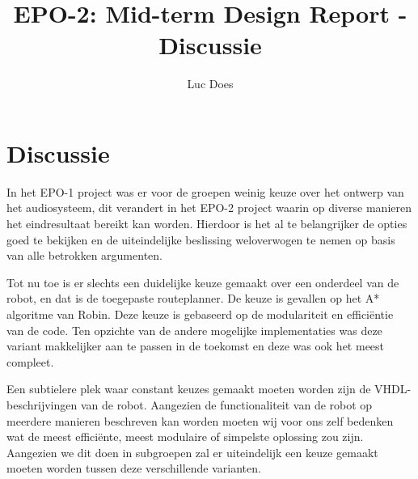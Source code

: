 \documentclass{report}
\title{EPO-2: Mid-term Design Report - Discussie}
\author{Luc Does}
\begin{document}
\chapter{Discussie}
\label{ch:discussie}

In het EPO-1 project was er voor de groepen weinig keuze over het ontwerp van het audiosysteem, dit verandert in het EPO-2 project waarin op diverse manieren het eindresultaat bereikt kan worden. Hierdoor is het al te belangrijker de opties goed te bekijken en de uiteindelijke beslissing weloverwogen te nemen op basis van alle betrokken argumenten. \newline

Tot nu toe is er slechts een duidelijke keuze gemaakt over een onderdeel van de robot, en dat is de toegepaste routeplanner. De keuze is gevallen op het A* algoritme van Robin. Deze keuze is gebaseerd op de modulariteit en efficiëntie van de code. Ten opzichte van de andere mogelijke implementaties was deze variant makkelijker aan te passen in de toekomst en deze was ook het meest compleet. \newline

Een subtielere plek waar constant keuzes gemaakt moeten worden zijn de VHDL-beschrijvingen van de robot. Aangezien de functionaliteit van de robot op meerdere manieren beschreven kan worden moeten wij voor ons zelf bedenken wat de meest efficiënte, meest modulaire of simpelste oplossing zou zijn. Aangezien we dit doen in subgroepen zal er uiteindelijk een keuze gemaakt moeten worden tussen deze verschillende varianten. \newline
\end{document}

